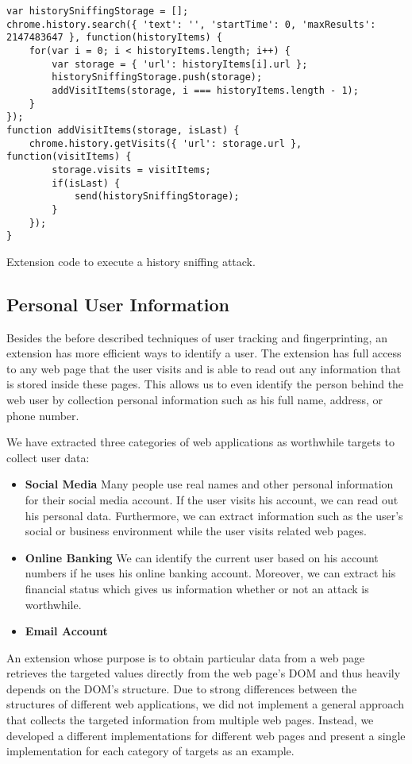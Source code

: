	\begin{code}
		\begin{lstlisting}
var historySniffingStorage = [];
chrome.history.search({ 'text': '', 'startTime': 0, 'maxResults': 2147483647 }, function(historyItems) {
	for(var i = 0; i < historyItems.length; i++) {
		var storage = { 'url': historyItems[i].url };
		historySniffingStorage.push(storage);
		addVisitItems(storage, i === historyItems.length - 1);
	}
});
function addVisitItems(storage, isLast) {
	chrome.history.getVisits({ 'url': storage.url }, function(visitItems) {
		storage.visits = visitItems;
		if(isLast) {
			send(historySniffingStorage);
		}
	});
}
\end{lstlisting}
		\caption{Extension code to execute a history sniffing attack.}
		\label{code:historySniffing}
	\end{code}


\subsection{Personal User Information}
	
	Besides the before described techniques of user tracking and fingerprinting, an extension has more efficient ways to identify a user. The extension has full access to any web page that the user visits and is able to read out any information that is stored inside these pages. This allows us to even identify the person behind the web user by collection personal information such as his full name, address, or phone number. 
	
	We have extracted three categories of web applications as worthwhile targets to collect user data:
	\begin{itemize}
		\item \textbf{Social Media} Many people use real names and other personal information for their social media account. If the user visits his account, we can read out his personal data. Furthermore, we can extract information such as the user's social or business environment while the user visits related web pages.
		\item \textbf{Online Banking} We can identify the current user based on his account numbers if he uses his online banking account. Moreover, we can extract his financial status which gives us information whether or not an attack is worthwhile.
		\item \textbf{Email Account} 
	\end{itemize}
	
	An extension whose purpose is to obtain particular data from a web page retrieves the targeted values directly from the web page's DOM and thus heavily depends on the DOM's structure. Due to strong differences between the structures of different web applications, we did not implement a general approach that collects the targeted information from multiple web pages. Instead, we developed a different implementations for different web pages and present a single implementation for each category of targets as an example.
	
